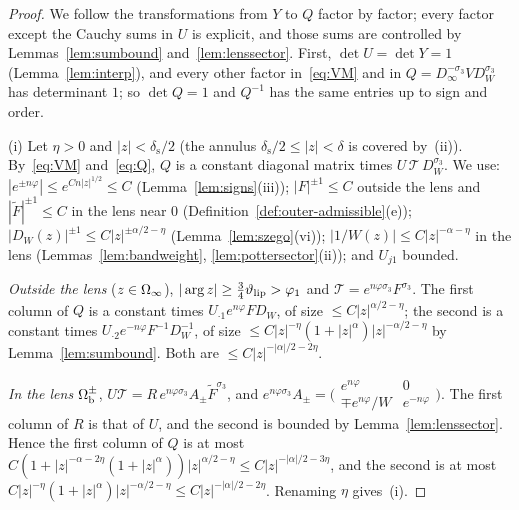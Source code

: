 \begin{proof}
We follow the transformations from $Y$ to $Q$ factor by factor; every factor except the Cauchy sums in $U$ is explicit,
and those sums are controlled by Lemmas~\ref{lem:sumbound} and~\ref{lem:lenssector}. First, $\det U=\det Y=1$
(Lemma~\ref{lem:interp}), and every other factor in~\eqref{eq:VM} and in $Q=D_\infty^{-\sigma_3}VD_W^{\sigma_3}$ has
determinant $1$; so $\det Q=1$ and $Q^{-1}$ has the same entries up to sign and order.

(i) Let $\eta>0$ and $|z|<\delta_{\mathrm s}/2$ (the annulus $\delta_{\mathrm s}/2\le|z|<\delta$ is covered by~(ii)). By~\eqref{eq:VM} and~\eqref{eq:Q},
$Q$ is a constant diagonal matrix times $U\,\mathcal T\,D_W^{\sigma_3}$. We use: $|e^{\pm n\varphi}|\le e^{Cn|z|^{1/2}}\le C$ (Lemma~\ref{lem:signs}(iii)); $|F|^{\pm1}\le C$ outside
the lens and $|\tilde F|^{\pm1}\le C$ in the lens near $0$ (Definition~\ref{def:outer-admissible}(e)); $|D_W(z)|^{\pm1}\le C|z|^{\pm\alpha/2-\eta}$
(Lemma~\ref{lem:szego}(vi)); $|1/W(z)|\le C|z|^{-\alpha-\eta}$ in the lens (Lemmas~\ref{lem:bandweight},
\ref{lem:pottersector}(ii)); and $U_{j1}$ bounded.

\emph{Outside the lens} ($z\in\Omega_{\infty}$), $|\arg z|\ge\frac34\vartheta_{\mathrm{lip}}>\varphi_1$ and $\mathcal T=e^{n\varphi\sigma_3}F^{\sigma_3}$. The first column of
$Q$ is a constant times $U_{\cdot1}e^{n\varphi}FD_W$, of size $\le C|z|^{\alpha/2-\eta}$; the second is a constant times
$U_{\cdot2}e^{-n\varphi}F^{-1}D_W^{-1}$, of size $\le C|z|^{-\eta}(1+|z|^\alpha)|z|^{-\alpha/2-\eta}$ by Lemma~\ref{lem:sumbound}. Both are
$\le C|z|^{-|\alpha|/2-2\eta}$.

\emph{In the lens} $\Omega_{\mathrm{b}}^\pm$, $U\mathcal T=R\,e^{n\varphi\sigma_3}A_\pm\tilde F^{\sigma_3}$, and
$e^{n\varphi\sigma_3}A_\pm=\bigl(\begin{smallmatrix}e^{n\varphi}&0\\\mp e^{n\varphi}/W&e^{-n\varphi}\end{smallmatrix}\bigr)$. The first column of
$R$ is that of $U$, and the second is bounded by Lemma~\ref{lem:lenssector}. Hence the first column of $Q$ is at most
$C(1+|z|^{-\alpha-2\eta}(1+|z|^\alpha))|z|^{\alpha/2-\eta}\le C|z|^{-|\alpha|/2-3\eta}$, and the second is at most
$C|z|^{-\eta}(1+|z|^\alpha)|z|^{-\alpha/2-\eta}\le C|z|^{-|\alpha|/2-2\eta}$. Renaming $\eta$ gives~(i).


\end{proof}
